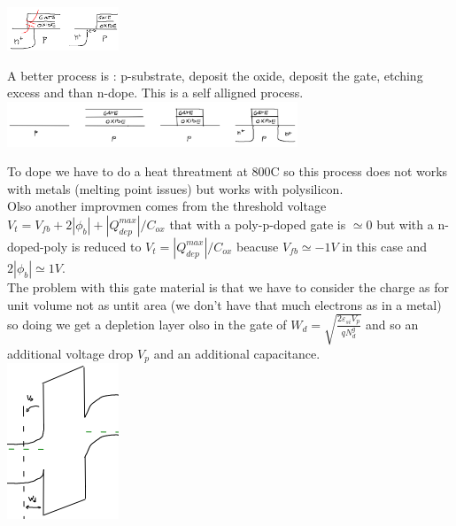 \centering
\includegraphics[width=0.25\textwidth]{process1par.png}\\
\raggedright

A better process is : p-substrate, deposit the oxide, deposit the gate, etching excess and than n-dope. This is a self alligned process.\\

\centering
\includegraphics[width=0.65\textwidth]{process2.png}\\
\raggedright

To dope we have to do a heat threatment at 800C so this process does not works with metals (melting point issues) but works with polysilicon.\\
Olso another improvmen comes from the threshold voltage $V_t=V_{fb}+2|\phi_b|+|Q_{dep}^{max}|/C_{ox}$ that with a poly-p-doped gate is $\simeq 0$ but with a n-doped-poly is reduced to $V_t=|Q_{dep}^{max}|/C_{ox}$ beacuse $V_{fb}\simeq -1V$ in this case and $2|\phi_b|\simeq 1V$.\\
The problem with this gate material is that we have to consider the charge as for unit volume not as untit area (we don't have that much electrons as in a metal) so doing we get a depletion layer olso in the gate of $W_d=\sqrt{\frac{2\varepsilon_{si}V_p}{qN_d^g}}$ and so an additional voltage drop $V_p$ and an additional capacitance.\\

\centering
\includegraphics[width=0.25\textwidth]{polygate.png}\\
\raggedright

